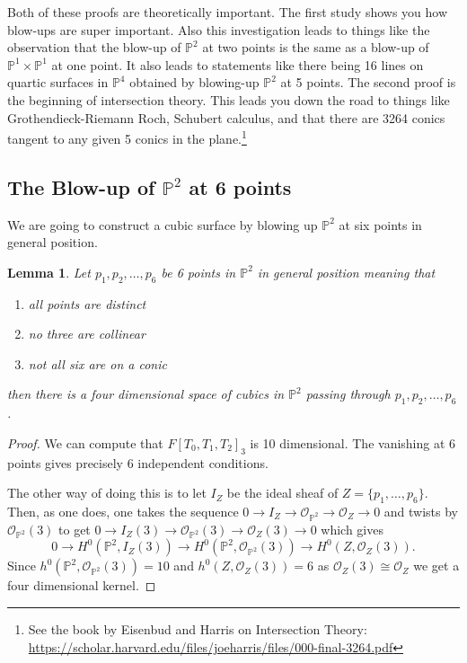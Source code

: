 \documentclass[12pt]{article}
\numberwithin{equation}{section}
\newtheorem{lemma}[theorem]{Lemma}
\theoremstyle{definition}
\theoremstyle{remark}
\newcommand{\Ocal}{\mathcal{O}}
\newcommand{\PP}{\mathbb{P}}
\begin{document}
Both of these proofs are theoretically important. 
The first study shows you how blow-ups are super important. 
Also this investigation leads to things like the observation that the blow-up of $\PP^2$ at two points is the same as a blow-up of $\PP^1\times\PP^1$ at one point. 
It also leads to statements like there being 16 lines on quartic surfaces in $\PP^4$ obtained by blowing-up $\PP^2$ at 5 points. 
The second proof is the beginning of intersection theory. 
This leads you down the road to things like Grothendieck-Riemann Roch, Schubert calculus, and that there are 3264 conics tangent to any given 5 conics in the plane.\footnote{See the book by Eisenbud and Harris on Intersection Theory: \url{https://scholar.harvard.edu/files/joeharris/files/000-final-3264.pdf}}



\subsection{The Blow-up of $\PP^2$ at 6 points}
We are going to construct a cubic surface by blowing up $\PP^2$ at six points in general position.
\begin{lemma}
	Let $p_1,p_2,\ldots,p_6$ be 6 points in $\PP^2$ in general position meaning that 
	\begin{enumerate}
		\item all points are distinct
		\item no three are collinear
		\item not all six are on a conic
	\end{enumerate}	
	then there is a four dimensional space of cubics in $\PP^2$ passing through $p_1,p_2,\ldots,p_6$.
\end{lemma}
\begin{proof}
	We can compute that $F[T_0,T_1,T_2]_3$ is 10 dimensional. 
	The vanishing at $6$ points gives precisely 6 independent conditions. 
	
	The other way of doing this is to let $I_Z$ be the ideal sheaf of $Z=\lbrace p_1,\ldots,p_6\rbrace$. 
	Then, as one does, one takes the sequence $0\to I_Z \to \Ocal_{\PP^2} \to \Ocal_Z \to 0$ and twists by $\Ocal_{\PP^2}(3)$ to get $0\to I_Z(3) \to \Ocal_{\PP^2}(3) \to \Ocal_Z(3) \to 0$ which gives
	$$ 0 \to H^0(\PP^2,I_Z(3)) \to H^0(\PP^2,\Ocal_{\PP^2}(3) ) \to H^0(Z,\Ocal_Z(3)). $$
	Since $h^0(\PP^2,\Ocal_{\PP^2}(3)) = 10$ and $h^0(Z,\Ocal_Z(3))=6$ as $\Ocal_Z(3)\cong \Ocal_Z$ we get a four dimensional kernel. 
\end{proof}
\end{document}

